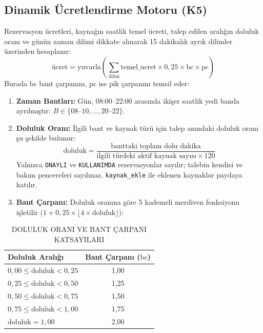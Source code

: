 \documentclass[conference]{IEEEtran}
\begin{document}
\subsection{Dinamik Ücretlendirme Motoru (K5)}
Rezervasyon ücretleri, kaynağın saatlik temel ücreti, talep edilen aralığın doluluk oranı ve günün zaman dilimi dikkate alınarak 15 dakikalık ayrık dilimler üzerinden hesaplanır:
\begin{equation}
\text{ücret} = \text{yuvarla}\left(\sum_{\text{dilim}} \text{temel\_ucret} \times 0{,}25 \times \text{bc} \times \text{pc}\right)
\label{eq:ucret}
\end{equation}
Burada $\text{bc}$ bant çarpanını, $\text{pc}$ ise pik çarpanını temsil eder:
\begin{enumerate}
    \item \textbf{Zaman Bantları:} Gün, 08:00--22:00 arasında ikişer saatlik yedi banda ayrılmıştır: $B \in \{08\text{--}10, \dots, 20\text{--}22\}$.
    \item \textbf{Doluluk Oranı:} İlgili bant ve kaynak türü için talep anındaki doluluk oranı şu şekilde bulunur:
    \begin{equation}
    \text{doluluk} = \frac{\text{banttaki toplam dolu dakika}}{\text{ilgili türdeki aktif kaynak sayısı} \times 120}
    \end{equation}
    Yalnızca \texttt{ONAYLI} ve \texttt{KULLANIMDA} rezervasyonlar sayılır; talebin kendisi ve bakım pencereleri sayılmaz. \texttt{kaynak\_ekle} ile eklenen kaynaklar paydaya katılır.
    \item \textbf{Bant Çarpanı:} Doluluk oranına göre 5 kademeli merdiven fonksiyonu işletilir ($1 + 0{,}25 \times \lfloor 4 \times \text{doluluk} \rfloor$):
\end{enumerate}

\begin{table}[H]
\vspace{-4pt}
\caption{DOLULUK ORANI VE BANT ÇARPANI KATSAYILARI}
\label{tab:doluluk}
\centering
\begin{tabular}{lc}
\toprule
\textbf{Doluluk Aralığı} & \textbf{Bant Çarpanı ($\text{bc}$)} \\
\midrule
$0{,}00 \le \text{doluluk} < 0{,}25$ & 1,00 \\
$0{,}25 \le \text{doluluk} < 0{,}50$ & 1,25 \\
$0{,}50 \le \text{doluluk} < 0{,}75$ & 1,50 \\
$0{,}75 \le \text{doluluk} < 1{,}00$ & 1,75 \\
$\text{doluluk} = 1{,}00$ & 2,00 \\
\bottomrule
\end{tabular}
\vspace{-4pt}
\end{table}
\end{document}
